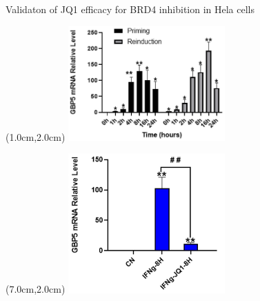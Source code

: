 \documentclass{beamer}					%
\begin{document}
\begin{frame}{Validaton of JQ1 efficacy for BRD4 inhibition in Hela cells}
\begin{textblock*}{6cm}(1.0cm,2.0cm)
\includegraphics[width=6cm]{GBP5-RT-qPCR-crop.png}
\end{textblock*}
\begin{textblock*}{6cm}(7.0cm,2.0cm)
\includegraphics[width=6cm]{GBP5-JQ1-KD-crop.png}
\end{textblock*}
\end{frame}
\end{document}

